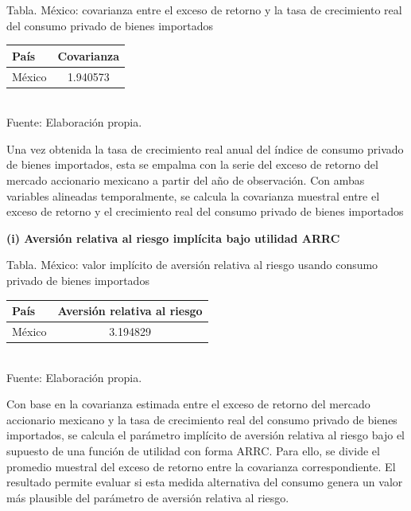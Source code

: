 \documentclass{article}\usepackage[]{graphicx}\usepackage[]{xcolor}
\begin{document}
\begin{center}
Tabla. México: covarianza entre el exceso de retorno y la tasa de crecimiento real del consumo privado de bienes importados
\end{center}
\begin{center}

\begin{tabular}{lc}
\toprule
País & Covarianza\\
\midrule
México & 1.940573\\
\bottomrule
\end{tabular}
\\[0.3em]
{\footnotesize Fuente: Elaboración propia.}
\end{center}


Una vez obtenida la tasa de crecimiento real anual del índice de consumo privado de bienes importados, esta se empalma con la serie del exceso de retorno del mercado accionario mexicano a partir del año de observación. Con ambas variables alineadas temporalmente, se calcula la covarianza muestral entre el exceso de retorno y el crecimiento real del consumo privado de bienes importados

\newpage
\textbf{(i) Aversión relativa al riesgo implícita bajo utilidad ARRC}



\begin{center}
Tabla. México: valor implícito de aversión relativa al riesgo usando consumo privado de bienes importados
\end{center}
\begin{center}

\begin{tabular}{lc}
\toprule
País & Aversión relativa al riesgo\\
\midrule
México & 3.194829\\
\bottomrule
\end{tabular}
\\[0.3em]
{\footnotesize Fuente: Elaboración propia.}
\end{center}


Con base en la covarianza estimada entre el exceso de retorno del mercado accionario mexicano y la tasa de crecimiento real del consumo privado de bienes importados, se calcula el parámetro implícito de aversión relativa al riesgo bajo el supuesto de una función de utilidad con forma ARRC. Para ello, se divide el promedio muestral del exceso de retorno entre la covarianza correspondiente. El resultado permite evaluar si esta medida alternativa del consumo genera un valor más plausible del parámetro de aversión relativa al riesgo.
\end{document}
